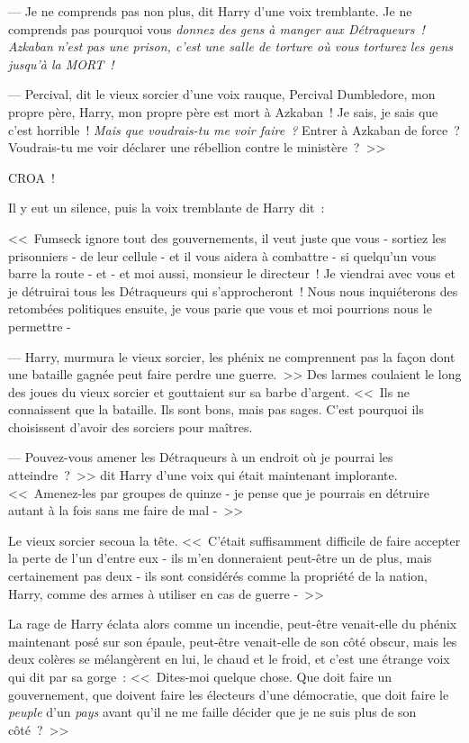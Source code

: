 --- Je ne comprends pas non plus, dit Harry d'une voix tremblante. Je ne comprends pas pourquoi vous \emph{donnez des gens à manger aux Détraqueurs~! Azkaban n'est pas une prison, c'est une salle de torture où vous torturez les gens jusqu'à la MORT~!}

--- Percival, dit le vieux sorcier d'une voix rauque, Percival Dumbledore, mon propre père, Harry, mon propre père est mort à Azkaban~! Je sais, je sais que c'est horrible~! \emph{Mais que voudrais-tu me voir faire~?} Entrer à Azkaban de force~? Voudrais-tu me voir déclarer une rébellion contre le ministère~?~>>

CROA~!

Il y eut un silence, puis la voix tremblante de Harry dit~:

<<~Fumseck ignore tout des gouvernements, il veut juste que vous - sortiez les prisonniers - de leur cellule - et il vous aidera à combattre - si quelqu'un vous barre la route - et - et moi aussi, monsieur le directeur~! Je viendrai avec vous et je détruirai tous les Détraqueurs qui s'approcheront~! Nous nous inquiéterons des retombées politiques ensuite, je vous parie que vous et moi pourrions nous le permettre -

--- Harry, murmura le vieux sorcier, les phénix ne comprennent pas la façon dont une bataille gagnée peut faire perdre une guerre.~>> Des larmes coulaient le long des joues du vieux sorcier et gouttaient sur sa barbe d'argent. <<~Ils ne connaissent que la bataille. Ils sont bons, mais pas sages. C'est pourquoi ils choisissent d'avoir des sorciers pour maîtres.

--- Pouvez-vous amener les Détraqueurs à un endroit où je pourrai les atteindre~?~>> dit Harry d'une voix qui était maintenant implorante. <<~Amenez-les par groupes de quinze - je pense que je pourrais en détruire autant à la fois sans me faire de mal -~>>

Le vieux sorcier secoua la tête. <<~C'était suffisamment difficile de faire accepter la perte de l'un d'entre eux - ils m'en donneraient peut-être un de plus, mais certainement pas deux - ils sont considérés comme la propriété de la nation, Harry, comme des armes à utiliser en cas de guerre -~>>

La rage de Harry éclata alors comme un incendie, peut-être venait-elle du phénix maintenant posé sur son épaule, peut-être venait-elle de son côté obscur, mais les deux colères se mélangèrent en lui, le chaud et le froid, et c'est une étrange voix qui dit par sa gorge~: <<~Dites-moi quelque chose. Que doit faire un gouvernement, que doivent faire les électeurs d'une démocratie, que doit faire le \emph{peuple} d'un \emph{pays} avant qu'il ne me faille décider que je ne suis plus de son côté~?~>>

